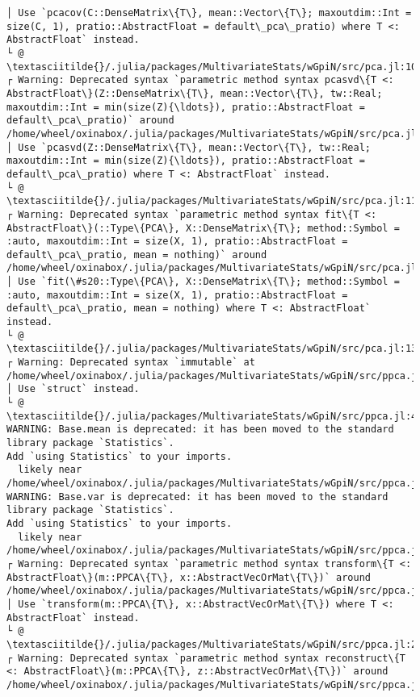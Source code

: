 \documentclass[11pt]{article}
\begin{document}
\begin{Verbatim}[commandchars=\\\{\}]
│ Use `pcacov(C::DenseMatrix\{T\}, mean::Vector\{T\}; maxoutdim::Int = size(C, 1), pratio::AbstractFloat = default\_pca\_pratio) where T <: AbstractFloat` instead.
└ @ \textasciitilde{}/.julia/packages/MultivariateStats/wGpiN/src/pca.jl:103
┌ Warning: Deprecated syntax `parametric method syntax pcasvd\{T <: AbstractFloat\}(Z::DenseMatrix\{T\}, mean::Vector\{T\}, tw::Real; maxoutdim::Int = min(size(Z){\ldots}), pratio::AbstractFloat = default\_pca\_pratio)` around /home/wheel/oxinabox/.julia/packages/MultivariateStats/wGpiN/src/pca.jl:117.
│ Use `pcasvd(Z::DenseMatrix\{T\}, mean::Vector\{T\}, tw::Real; maxoutdim::Int = min(size(Z){\ldots}), pratio::AbstractFloat = default\_pca\_pratio) where T <: AbstractFloat` instead.
└ @ \textasciitilde{}/.julia/packages/MultivariateStats/wGpiN/src/pca.jl:117
┌ Warning: Deprecated syntax `parametric method syntax fit\{T <: AbstractFloat\}(::Type\{PCA\}, X::DenseMatrix\{T\}; method::Symbol = :auto, maxoutdim::Int = size(X, 1), pratio::AbstractFloat = default\_pca\_pratio, mean = nothing)` around /home/wheel/oxinabox/.julia/packages/MultivariateStats/wGpiN/src/pca.jl:139.
│ Use `fit(\#s20::Type\{PCA\}, X::DenseMatrix\{T\}; method::Symbol = :auto, maxoutdim::Int = size(X, 1), pratio::AbstractFloat = default\_pca\_pratio, mean = nothing) where T <: AbstractFloat` instead.
└ @ \textasciitilde{}/.julia/packages/MultivariateStats/wGpiN/src/pca.jl:139
┌ Warning: Deprecated syntax `immutable` at /home/wheel/oxinabox/.julia/packages/MultivariateStats/wGpiN/src/ppca.jl:4.
│ Use `struct` instead.
└ @ \textasciitilde{}/.julia/packages/MultivariateStats/wGpiN/src/ppca.jl:4
WARNING: Base.mean is deprecated: it has been moved to the standard library package `Statistics`.
Add `using Statistics` to your imports.
  likely near /home/wheel/oxinabox/.julia/packages/MultivariateStats/wGpiN/src/ppca.jl:15
WARNING: Base.var is deprecated: it has been moved to the standard library package `Statistics`.
Add `using Statistics` to your imports.
  likely near /home/wheel/oxinabox/.julia/packages/MultivariateStats/wGpiN/src/ppca.jl:17
┌ Warning: Deprecated syntax `parametric method syntax transform\{T <: AbstractFloat\}(m::PPCA\{T\}, x::AbstractVecOrMat\{T\})` around /home/wheel/oxinabox/.julia/packages/MultivariateStats/wGpiN/src/ppca.jl:23.
│ Use `transform(m::PPCA\{T\}, x::AbstractVecOrMat\{T\}) where T <: AbstractFloat` instead.
└ @ \textasciitilde{}/.julia/packages/MultivariateStats/wGpiN/src/ppca.jl:23
┌ Warning: Deprecated syntax `parametric method syntax reconstruct\{T <: AbstractFloat\}(m::PPCA\{T\}, z::AbstractVecOrMat\{T\})` around /home/wheel/oxinabox/.julia/packages/MultivariateStats/wGpiN/src/ppca.jl:30.

\end{Verbatim}
\end{document}
